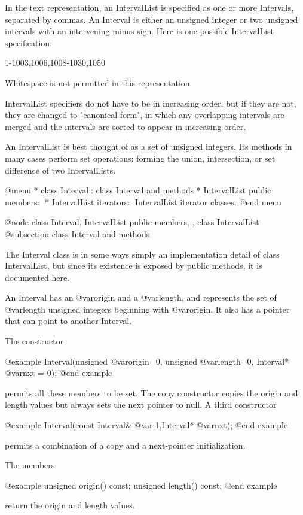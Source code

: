 In the text representation, an IntervalList is specified as one
or more Intervals, separated by commas.  An Interval is either
an unsigned integer or two unsigned intervals with an intervening
minus sign.  Here is one possible IntervalList specification:

1-1003,1006,1008-1030,1050

Whitespace is not permitted in this representation.

IntervalList specifiers do not have to be in increasing order,
but if they are not, they are changed to "canonical form", in which
any overlapping intervals are merged and the intervals are sorted
to appear in increasing order.

An IntervalList is best thought of as a set of unsigned integers.
Its methods in many cases perform set operations: forming the
union, intersection, or set difference of two IntervalLists.

@menu
* class Interval::  class Interval and methods
* IntervalList public members::  
* IntervalList iterators::  IntervalList iterator classes.
@end menu

@node class Interval, IntervalList public members,  , class IntervalList
@subsection class Interval and methods

The Interval class is in some ways simply an implementation detail of
class IntervalList, but since its existence is exposed by public
methods, it is documented here.

An Interval has an @var{origin} and a @var{length}, and represents the
set of @var{length} unsigned integers beginning with @var{origin}.  It
also has a pointer that can point to another Interval.

The constructor

@example
Interval(unsigned @var{origin}=0, unsigned @var{length}=0,
    Interval* @var{nxt} = 0);
@end example

permits all these members to be set.  The copy constructor copies
the origin and length values but always sets the next pointer to null.
A third constructor

@example
Interval(const Interval& @var{i1},Interval* @var{nxt});
@end example

permits a combination of a copy and a next-pointer initialization.

The members

@example
unsigned origin() const;
unsigned length() const;
@end example

return the origin and length values.

